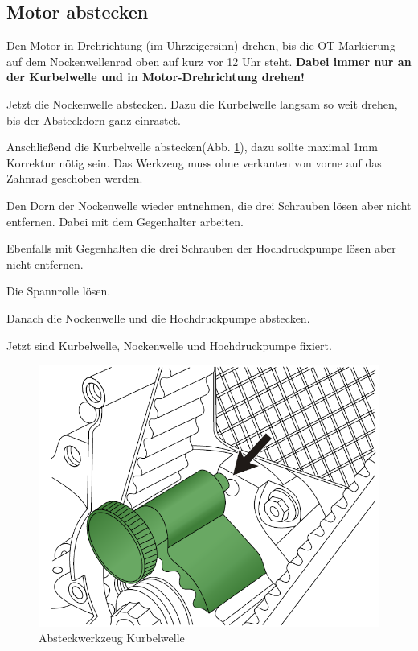 \documentclass[twoside,a4paper]{refart}
\begin{document}
\subsection{Motor abstecken}
Den Motor in Drehrichtung (im Uhrzeigersinn) drehen, bis die OT Markierung auf dem Nockenwellenrad oben auf kurz vor 12 Uhr steht. \textbf{Dabei immer nur an der Kurbelwelle und in Motor-Drehrichtung drehen!}

Jetzt die Nockenwelle abstecken. Dazu die Kurbelwelle langsam so weit drehen, bis der Absteckdorn ganz einrastet.

Anschließend die Kurbelwelle abstecken(Abb. \ref{fig:KurbelwelleAbstecken}), dazu sollte maximal 1mm Korrektur nötig sein. Das Werkzeug muss ohne verkanten von vorne auf das Zahnrad geschoben werden.

Den Dorn der Nockenwelle wieder entnehmen, die drei Schrauben lösen aber nicht entfernen. Dabei mit dem Gegenhalter arbeiten.

Ebenfalls mit Gegenhalten die drei Schrauben der Hochdruckpumpe lösen aber nicht entfernen.

Die Spannrolle lösen.

Danach die Nockenwelle und die Hochdruckpumpe abstecken.

Jetzt sind Kurbelwelle, Nockenwelle und Hochdruckpumpe fixiert.
\begin{figure}[htb]
	\begin{center}
		\includegraphics[width=\textwidth]{KurbelwelleAbstecken}
		\caption{Absteckwerkzeug Kurbelwelle}
		\label{fig:KurbelwelleAbstecken}
	\end{center}
\end{figure}
\end{document}
